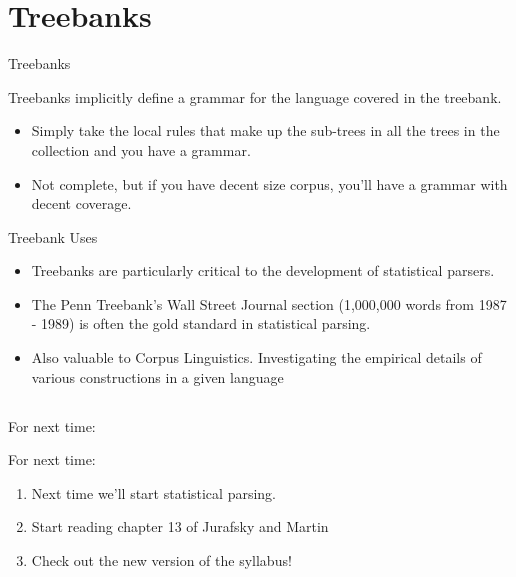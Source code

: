 \documentclass[9pt,xcolor=pdftex,dvipsnames,table]{beamer}
\begin{document}
\section{Treebanks}

\begin{frame}{Treebanks}

Treebanks implicitly define a grammar for
the language covered in the treebank.
\vspace{0.5cm}

\begin{itemize}
	\item Simply take the local rules that make up
the sub-trees in all the trees in the
collection and you have a grammar.
	\item Not complete, but if you have decent size
corpus, you'll have a grammar with decent
coverage.
	
\end{itemize}
\end{frame}

\begin{frame}{Treebank Uses}

\begin{itemize}
\item Treebanks are particularly critical to the development of
statistical parsers.
	\item The Penn Treebank's Wall Street Journal section (1,000,000 words from 1987 - 1989) is often the gold standard in statistical parsing.
\item Also valuable to Corpus Linguistics.  Investigating the empirical details of various
constructions in a given language
\end{itemize}
\end{frame}

\subsection{}
\begin{frame}{For next time:}
     \begin{block}{For next time:}
          \begin{enumerate}
     	  \item Next time we'll start statistical parsing.
     	  \item Start reading chapter 13 of Jurafsky and Martin
     	  \item Check out the new version of the syllabus!
          \end{enumerate}
     \end{block}
\end{frame}
\end{document}
